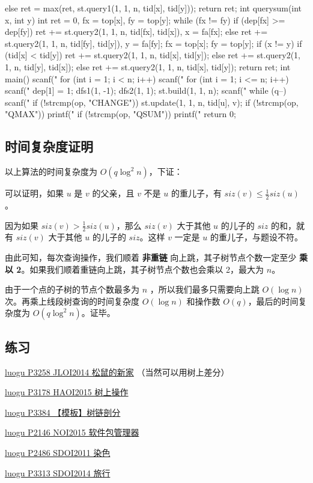 \begin{cppcode}
{{  } else
    ret = max(ret, st.query1(1, 1, n, tid[x], tid[y]));
  return ret;
}
int querysum(int x, int y) {
  int ret = 0, fx = top[x], fy = top[y];
  while (fx != fy) {
    if (dep[fx] >= dep[fy])
      ret += st.query2(1, 1, n, tid[fx], tid[x]), x = fa[fx];
    else
      ret += st.query2(1, 1, n, tid[fy], tid[y]), y = fa[fy];
    fx = top[x];
    fy = top[y];
  }
  if (x != y) {
    if (tid[x] < tid[y])
      ret += st.query2(1, 1, n, tid[x], tid[y]);
    else
      ret += st.query2(1, 1, n, tid[y], tid[x]);
  } else
    ret += st.query2(1, 1, n, tid[x], tid[y]);
  return ret;
}
int main() {
  scanf("%
  for (int i = 1; i < n; i++)
    scanf("%
  for (int i = 1; i <= n; i++) scanf("%
  dep[1] = 1;
  dfs1(1, -1);
  dfs2(1, 1);
  st.build(1, 1, n);
  scanf("%
  while (q--) {
    scanf("%
    if (!strcmp(op, "CHANGE")) st.update(1, 1, n, tid[u], v);
    if (!strcmp(op, "QMAX")) printf("%
    if (!strcmp(op, "QSUM")) printf("%
  }
  return 0;
}
\end{cppcode}

\subsection{时间复杂度证明}

以上算法的时间复杂度为 $O(q \log^2 n)$，下证：

可以证明，如果 $u$ 是 $v$ 的父亲，且 $v$ 不是 $u$ 的重儿子，有 $siz(v)\le \frac{1}{2} siz(u)$。

因为如果 $siz(v)> \frac{1}{2} siz(u)$，那么 $siz(v)$ 大于其他 $u$ 的儿子的 $siz$ 的和，就有 $siz(v)$ 大于其他 $u$ 的儿子的 $siz$。这样 $v$ 一定是 $u$ 的重儿子，与题设不符。

由此可知，每次查询操作，我们顺着 \textbf{非重链} 向上跳，其子树节点个数一定至少 \textbf{乘以 2}。如果我们顺着重链向上跳，其子树节点个数也会乘以 2，最大为 $n$。

由于一个点的子树的节点个数最多为 $n$ ，所以我们最多只需要向上跳 $O(\log n)$ 次。再乘上线段树查询的时间复杂度 $O(\log n)$ 和操作数 $O(q)$，最后的时间复杂度为 $O(q \log^2 n)$。证毕。

\subsection{练习}

\href{https://www.luogu.org/problemnew/show/P3258}{luogu P3258 JLOI2014  松鼠的新家} （当然可以用树上差分）

\href{https://www.luogu.org/problemnew/show/P3178}{luogu P3178 HAOI2015  树上操作}

\href{https://www.luogu.org/problemnew/show/P3384}{luogu P3384 【模板】树链剖分}

\href{https://www.luogu.org/problemnew/show/P2146}{luogu P2146 NOI2015  软件包管理器}

\href{https://www.luogu.org/problemnew/show/P2486}{luogu P2486 SDOI2011  染色}

\href{https://www.luogu.org/problemnew/show/P3313}{luogu P3313 SDOI2014  旅行}
